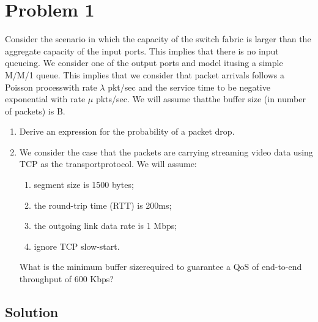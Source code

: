 \section*{Problem 1}

Consider the scenario in which the capacity of the switch fabric is larger than the aggregate capacity of the input ports.
This implies that there is no input queueing.
We consider one of the output ports and model itusing a simple M/M/1 queue.
This implies that we consider that packet arrivals follows a Poisson processwith rate $\lambda$ pkt/sec and the service time to be negative exponential with rate $\mu$ pkts/sec.
We will assume thatthe buffer size (in number of packets) is B.

\begin{enumerate}
      \item Derive an expression for the probability of a packet drop.
      \item We consider the case that the packets are carrying streaming video data using TCP as the transportprotocol.
            We will assume:
            \begin{enumerate}
                  \item segment size is 1500 bytes;
                  \item the round-trip time (RTT) is 200ms;
                  \item the outgoing link data rate is 1 Mbps;
                  \item ignore TCP slow-start.
            \end{enumerate}
            What is the minimum buffer sizerequired to guarantee a QoS of end-to-end throughput of 600 Kbps?
\end{enumerate}

\subsection*{Solution}
